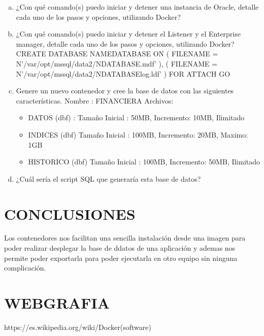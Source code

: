 \documentclass[preprint,12pt]{elsarticle}
\begin{document}
\begin{enumerate}[a)]
\item ¿Con qué comando(s) puedo iniciar y detener una instancia de Oracle, detalle cada uno de los pasos y opciones, utilizando Docker?\newline


\item ¿Con qué comando(s) puedo iniciar y detener el Listener y el Enterprise manager, detalle cada uno de los pasos y opciones, utilizando Docker?\newline
CREATE DATABASE NAMEDATABASE ON \newline
( FILENAME = N'/var/opt/mssql/data2/NDATABASE.mdf' ),\newline
( FILENAME = N'/var/opt/mssql/data2/NDATABASElog.ldf' )\newline
FOR ATTACH\newline
GO\newline
\item Genere un nuevo contenedor y cree la base de datos con las siguientes características.\newline
Nombre : FINANCIERA \newline
Archivos:
\begin{itemize}
\item DATOS (dbf) : Tamaño Inicial : 50MB, Incremento: 10MB, Ilimitado
\item INDICES (dbf) Tamaño Inicial : 100MB, Incremento: 20MB, Maximo: 1GB
\item HISTORICO (dbf) Tamaño Inicial : 100MB, Incremento: 50MB, Ilimitado
\end{itemize}
\item ¿Cuál sería el script SQL que generaría esta base de datos?
\begin{figure}[htb]
	\begin{center}
	\end{center}
\end{figure}
\end{enumerate}

\section{CONCLUSIONES}
Los contenedores nos facilitan una sencilla instalación desde una imagen para poder realizar desplegar la base de ddatos de una aplicación y ademas nos permite poder exportarla para poder ejecutarla en otro equipo sin ninguna complicación.

\section{WEBGRAFIA}
https://es.wikipedia.org/wiki/Docker(software)\newline
\end{document}
